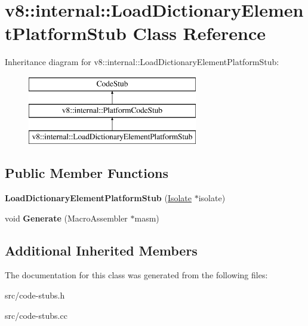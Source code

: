 \hypertarget{classv8_1_1internal_1_1_load_dictionary_element_platform_stub}{}\section{v8\+:\+:internal\+:\+:Load\+Dictionary\+Element\+Platform\+Stub Class Reference}
\label{classv8_1_1internal_1_1_load_dictionary_element_platform_stub}
Inheritance diagram for v8\+:\+:internal\+:\+:Load\+Dictionary\+Element\+Platform\+Stub\+:\begin{figure}[H]
\begin{center}
\leavevmode
\includegraphics[height=3.000000cm]{classv8_1_1internal_1_1_load_dictionary_element_platform_stub}
\end{center}
\end{figure}
\subsection*{Public Member Functions}
\begin{DoxyCompactItemize}
\item 
\hypertarget{classv8_1_1internal_1_1_load_dictionary_element_platform_stub_a85fb86bef9ea38828506ebea477084c5}{}{\bfseries Load\+Dictionary\+Element\+Platform\+Stub} (\hyperlink{classv8_1_1internal_1_1_isolate}{Isolate} $\ast$isolate)\label{classv8_1_1internal_1_1_load_dictionary_element_platform_stub_a85fb86bef9ea38828506ebea477084c5}

\item 
\hypertarget{classv8_1_1internal_1_1_load_dictionary_element_platform_stub_a1341c3e7d2c63e15921ffb28ce8de0be}{}void {\bfseries Generate} (Macro\+Assembler $\ast$masm)\label{classv8_1_1internal_1_1_load_dictionary_element_platform_stub_a1341c3e7d2c63e15921ffb28ce8de0be}

\end{DoxyCompactItemize}
\subsection*{Additional Inherited Members}


The documentation for this class was generated from the following files\+:\begin{DoxyCompactItemize}
\item 
src/code-\/stubs.\+h\item 
src/code-\/stubs.\+cc\end{DoxyCompactItemize}
